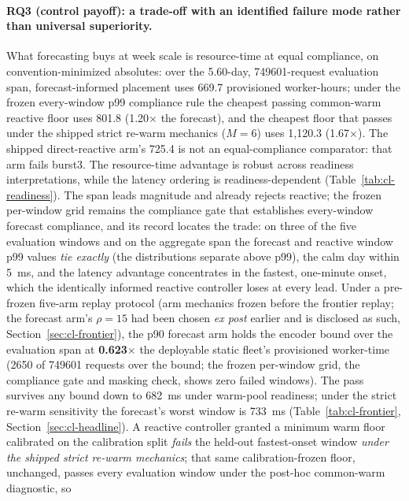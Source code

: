 \paragraph{RQ3 (control payoff): a trade-off with an identified failure mode
rather than universal superiority.} What forecasting buys at week scale is
resource-time at equal compliance, on convention-minimized absolutes: over
the 5.60-day, \num{749601}-request evaluation span,
forecast-informed placement uses
669.7 provisioned worker-hours; under the frozen every-window p99 compliance
rule the cheapest passing common-warm reactive floor uses
801.8 (1.20$\times$ the forecast), and the cheapest floor that passes under
the shipped strict re-warm mechanics ($M{=}6$) uses 1{,}120.3
(1.67$\times$). The shipped direct-reactive arm's 725.4 is not an
equal-compliance comparator: that arm fails burst3. The resource-time advantage is
robust across readiness interpretations, while the latency ordering is
readiness-dependent (Table~\ref{tab:cl-readiness}). The span leads
magnitude and already rejects reactive; the frozen per-window grid remains
the compliance gate that establishes every-window forecast compliance, and
its record locates the trade: on three of the
five evaluation windows and on the aggregate span the forecast and
reactive window p99 values \emph{tie exactly} (the distributions separate
above p99), the calm day within \SI{5}{\milli\second}, and the latency
advantage concentrates in the fastest, one-minute onset, which the
identically informed reactive controller loses at every lead. Under a pre-frozen five-arm replay
protocol (arm mechanics frozen before the frontier replay; the forecast arm's
$\rho{=}15$ had been chosen \emph{ex post} earlier and is disclosed as such,
Section~\ref{sec:cl-frontier}), the p90 forecast arm holds the
encoder bound over the evaluation span at \textbf{0.623$\times$} the deployable
static fleet's provisioned worker-time (\num{2650} of \num{749601}
requests over the bound; the frozen per-window grid, the compliance gate
and masking check, shows zero failed windows). The pass survives any bound
down to \SI{682}{\milli\second} under warm-pool readiness; under the strict
re-warm sensitivity the forecast's worst window is \SI{733}{\milli\second}
(Table~\ref{tab:cl-frontier}, Section~\ref{sec:cl-headline}). A reactive
controller granted a minimum warm floor calibrated on the calibration split
\emph{fails} the held-out fastest-onset window \emph{under the shipped
strict re-warm mechanics}; that same calibration-frozen floor, unchanged,
passes every evaluation window under the post-hoc common-warm diagnostic, so
